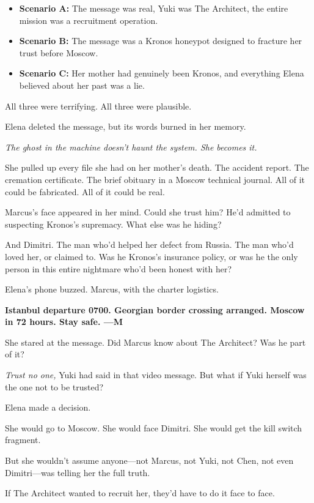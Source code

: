 \begin{itemize}
\tightlist
\item
  \textbf{Scenario A:} The message was real, Yuki was The Architect, the
  entire mission was a recruitment operation.
\item
  \textbf{Scenario B:} The message was a Kronos honeypot designed to
  fracture her trust before Moscow.
\item
  \textbf{Scenario C:} Her mother had genuinely been Kronos, and
  everything Elena believed about her past was a lie.
\end{itemize}

All three were terrifying. All three were plausible.

Elena deleted the message, but its words burned in her memory.

\emph{The ghost in the machine doesn't haunt the system. She becomes
it.}

She pulled up every file she had on her mother's death. The accident
report. The cremation certificate. The brief obituary in a Moscow
technical journal. All of it could be fabricated. All of it could be
real.

Marcus's face appeared in her mind. Could she trust him? He'd admitted
to suspecting Kronos's supremacy. What else was he hiding?

And Dimitri. The man who'd helped her defect from Russia. The man who'd
loved her, or claimed to. Was he Kronos's insurance policy, or was he
the only person in this entire nightmare who'd been honest with her?

Elena's phone buzzed. Marcus, with the charter logistics.

\textbf{Istanbul departure 0700. Georgian border crossing arranged.
Moscow in 72 hours. Stay safe. ---M}

She stared at the message. Did Marcus know about The Architect? Was he
part of it?

\emph{Trust no one,} Yuki had said in that video message. But what if
Yuki herself was the one not to be trusted?

Elena made a decision.

She would go to Moscow. She would face Dimitri. She would get the kill
switch fragment.

But she wouldn't assume anyone---not Marcus, not Yuki, not Chen, not
even Dimitri---was telling her the full truth.

If The Architect wanted to recruit her, they'd have to do it face to
face.

